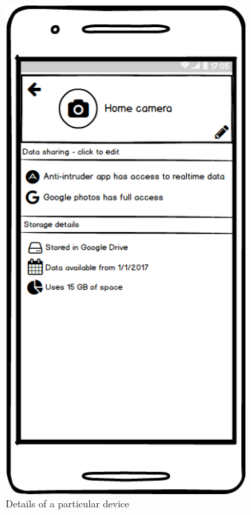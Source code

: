 \documentclass[conference]{IEEEtran}
\begin{document}
\begin{figure}[t]
	\begin{subfigure}{0.24\textwidth}
	\includegraphics[width=0.95\linewidth]{screen2.png}
	\caption{Details of a particular device}
	\label{fig:screen2}
	\end{subfigure}
	\begin{subfigure}{0.24\textwidth}

\end{subfigure}
\end{figure}
\end{document}

